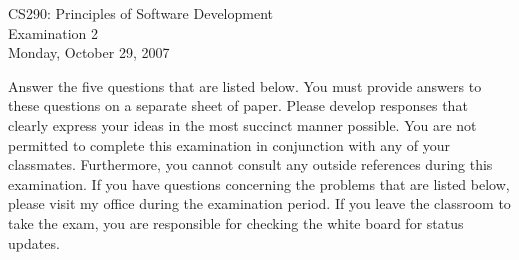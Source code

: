 \documentclass{article}
\def\widow#1{\vskip #1\vbadness10000\penalty-200\vskip-#1}
\theoremstyle{definition}
\begin{document}
\def\widow#1{\vskip #1\vbadness10000\penalty-200\vskip-#1}

\begin{center}

CS290: Principles of Software Development \\
Examination 2 \\
Monday, October 29, 2007 \\

\end{center}

\noindent
Answer the five questions that are listed below.  You must provide
answers to these questions on a separate sheet of paper.  Please
develop responses that clearly express your ideas in the most succinct
manner possible.  You are not permitted to complete this examination
in conjunction with any of your classmates.  Furthermore, you cannot
consult any outside references during this examination.  If you have
questions concerning the problems that are listed below, please visit
my office during the examination period.  If you leave the classroom
to take the exam, you are responsible for checking the white board for
status updates.


\vspace*{.2in}
\end{document}

